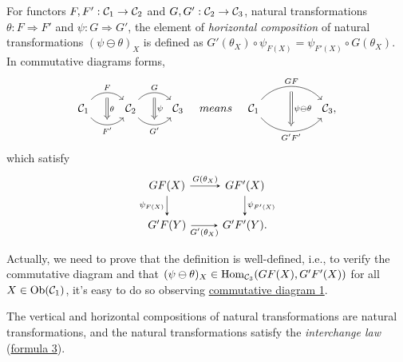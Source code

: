 \documentclass{article}
\begin{document}
\begin{defi}\label{horizontal composition}
	For functors $F,F':\mathcal{C}_1\to\mathcal{C}_2$ and $G,G':\mathcal{C}_2\to\mathcal{C}_3$, natural transformations $\theta:F\Rightarrow F'$ and $\psi:G\Rightarrow G'$, the element of \emph{horizontal composition} of natural transformations $(\psi\ominus\theta)_X$ is defined as $G'(\theta_X)\circ\psi_{F(X)}=\psi_{F'(X)}\circ G(\theta_X)$. In commutative diagrams forms,
	\[\begin{tikzcd}
			\ca_1 \arrow[bend left=50, r, "F", ""' name=F] \arrow[bend right=50, r, "F'"', "" name=F'] &
			\ca_2 \arrow[bend left=50, r, "G", ""' name=G] \arrow[bend right=50, r, "G'"', "" name=G'] &
			\arrow[Rightarrow, from=F, to=F', "\theta"] \arrow[Rightarrow, from=G, to=G', "\psi"]\ca_3
		\end{tikzcd}\quad{means}\quad\begin{tikzcd}
			\ca_1
			\arrow[bend left=50, rr, "GF", ""' name=A]
			\arrow[bend right=50, rr, "G'F'"', "" name=B] & & 
			\arrow[Rightarrow, from=A, to=B, "\psi\ominus\theta"]\ca_3,
	\end{tikzcd}\]
	which satisfy
	\begin{equation}\begin{tikzcd}\label{hor}
		GF(X) \arrow[->,>=stealth,r,"G(\theta_X)"] \arrow[->,>=stealth,d,"\psi_{F(X)}"'] & GF'(X) \arrow[->,>=stealth,d,"\psi_{F'(X)}"]\\
		G'F(Y) \arrow[->,>=stealth,r,"G'(\theta_X)"'] & G'F'(Y).
	\end{tikzcd}\end{equation}
	
	Actually, we need to prove that the definition is well-defined, i.e., to verify the commutative diagram and that $(\psi\ominus\theta)_X\in\mathrm{Hom}_{\mathcal{C}_3}(GF(X),G'F'(X))$ for all $X\in\mathrm{Ob}(\mathcal{C}_1)$, it's easy to do so observing \hyperref[ntr]{commutative diagram 1}.
\end{defi}


\begin{thm}
	The vertical and horizontal compositions of natural transformations are natural transformations, and the natural transformations satisfy the \emph{interchange law} (\hyperref[per]{formula 3}).	
\end{thm}
\end{document}
